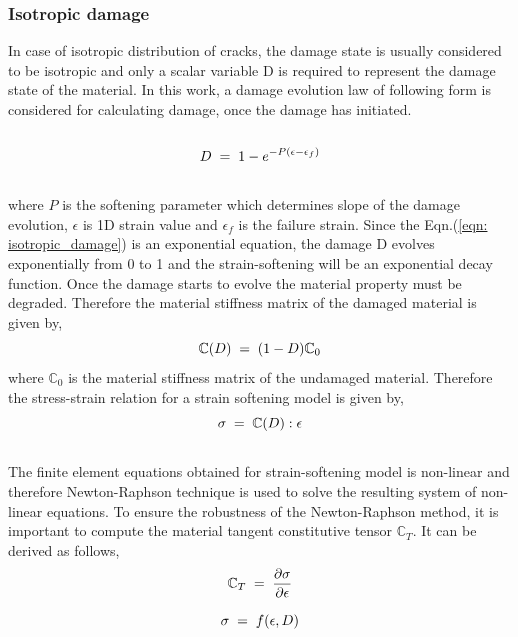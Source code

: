 \documentclass[a4paper,12pt]{article}
\begin{document}
\subsubsection{Isotropic damage}
\indent\indent\indent In case of isotropic distribution of cracks, the damage state is usually considered to be isotropic and only a scalar variable D is required to represent the damage state of the material. In this work, a damage evolution law of following form is considered for calculating damage, once the damage has initiated.\\
\\
\begin{equation}
  \Large{ D \; = \; 1 - e^{-P(\epsilon - \epsilon_{f})}}
  \label{eqn: isotropic_damage}
\end{equation} 
\\
where $P$ is the softening parameter which determines slope of the damage evolution, $\epsilon$ is 1D strain value and $\epsilon_{f}$ is the failure strain. Since the Eqn.(\ref{eqn: isotropic_damage}) is an exponential equation, the damage D evolves exponentially from 0 to 1 and the strain-softening will be an exponential decay function. Once the damage starts to evolve the material property must be degraded. Therefore the material stiffness matrix of the  damaged material is given by,\\
\begin{equation}
\Large{\mathbb{C}(D) \; = \; (1  - D) \mathbb{C}_{0} }
\end{equation} 
where $\mathbb{C}_{0}$ is the material stiffness matrix of the undamaged material. Therefore the stress-strain relation for a strain softening model is given by,\\
\begin{equation}
\Large{\sigma \; = \; \mathbb{C}(D) : \epsilon }  
\end{equation}
\\
The finite element equations obtained for strain-softening model is non-linear and therefore Newton-Raphson technique is used to solve the resulting system of non-linear equations. To ensure the robustness of the Newton-Raphson method, it is important to compute the material tangent constitutive tensor $\mathbb{C}_{T}$. It can be derived as follows,\\
\begin{equation*}
\Large{ \mathbb{C}_{T}  \; = \;\frac{\partial \sigma}{\partial \epsilon}  }
\end{equation*}

\begin{equation*}
\Large{\sigma  \; = \; f(\epsilon, D) }
\end{equation*}
\end{document}
